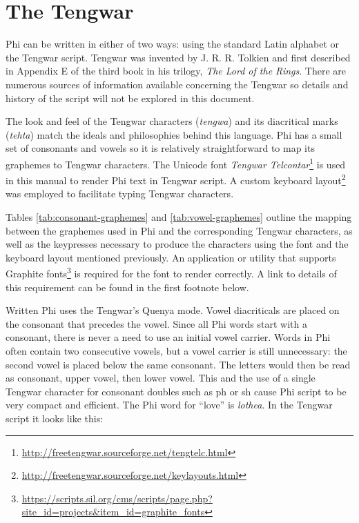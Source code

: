 \section{The Tengwar}
Phi can be written in either of two ways: using the standard Latin alphabet or the Tengwar script. Tengwar was invented by J. R. R. Tolkien and first described in Appendix E of the third book in his trilogy, \emph{The Lord of the Rings}. There are numerous sources of information available concerning the Tengwar so details and history of the script will not be explored in this document.

The look and feel of the Tengwar characters (\emph{tengwa}) and its diacritical marks (\emph{tehta}) match the ideals and philosophies behind this language. Phi has a small set of consonants and vowels so it is relatively straightforward to map its graphemes to Tengwar characters. The Unicode font \emph{Tengwar Telcontar}\footnote{\hspace{0.1em}\url{http://freetengwar.sourceforge.net/tengtelc.html}} is used in this manual to render Phi text in Tengwar script. A custom keyboard layout\footnote{\hspace{0.1em}\url{http://freetengwar.sourceforge.net/keylayouts.html}} was employed to facilitate typing Tengwar characters.

Tables \ref{tab:consonant-graphemes} and \ref{tab:vowel-graphemes} outline the mapping between the graphemes used in Phi and the corresponding Tengwar characters, as well as the keypresses necessary to produce the characters using the font and the keyboard layout mentioned previously. An application or utility that supports Graphite fonts\footnote{\hspace{0.1em}\url{https://scripts.sil.org/cms/scripts/page.php?site\_id=projects\&item\_id=graphite\_fonts}} is required for the font to render correctly. A link to details of this requirement can be found in the first footnote below.

Written Phi uses the Tengwar’s Quenya mode. Vowel diacriticals are placed on the consonant that precedes the vowel. Since all Phi words start with a consonant, there is never a need to use an initial vowel carrier. Words in Phi often contain two consecutive vowels, but a vowel carrier is still unnecessary: the second vowel is placed below the same consonant. The letters would then be read as consonant, upper vowel, then lower vowel. This and the use of a single Tengwar character for consonant doubles such as ph or sh cause Phi script to be very compact and efficient.
\clearpage
The Phi word for “love” is \emph{lothea}. In the Tengwar script it looks like this:

